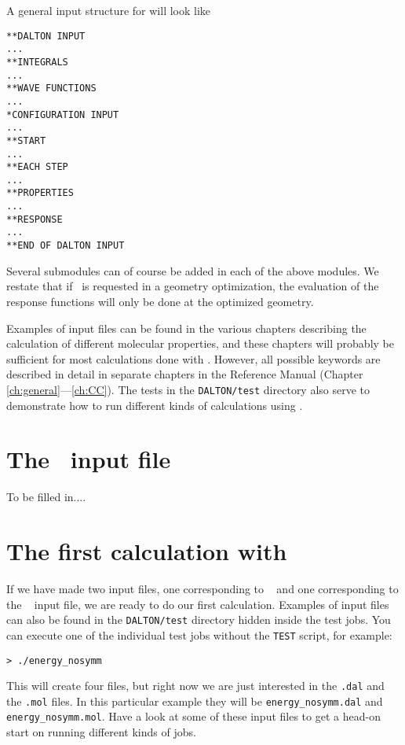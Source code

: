 A general input structure for {\dalton} will look like

\begin{verbatim}
**DALTON INPUT
...
**INTEGRALS
...
**WAVE FUNCTIONS
...
*CONFIGURATION INPUT
...
**START
...
**EACH STEP
...
**PROPERTIES
...
**RESPONSE
...
**END OF DALTON INPUT
\end{verbatim}

Several submodules can of course be added in each of the above
modules. We restate that if \resp\ is requested in a geometry
optimization, the evaluation of the response functions will only be
done at the optimized geometry.

Examples of input files can be found in the various chapters
describing the calculation of different molecular properties, and
these chapters will probably be sufficient for most calculations done
with {\dalton}. However, all possible keywords are described in detail
in separate chapters in the Reference Manual (Chapter \ref{ch:general}---\ref{ch:CC}). The tests in the
\verb|DALTON/test| directory also serve to demonstrate how to run
different kinds of calculations using {\dalton}.

\section{The \potinp\ input file}
To be filled in....

\section{The first calculation with {\dalton}}\label{sec:firstcalc}

If we have made two input files, one corresponding to
\dalinp\  and one corresponding to the \molinp\
 input file, we
are ready to do our first calculation. Examples of input files can
also be found in the \verb|DALTON/test| directory hidden inside the
test jobs. You can execute one of the individual test jobs
without the \verb|TEST| script, for example:
\begin{verbatim}
> ./energy_nosymm
\end{verbatim}
This will create four files, but right now we are just interested in
the \verb|.dal| and the \verb|.mol| files. In this particular example
they will be \verb|energy_nosymm.dal| and
\verb|energy_nosymm.mol|. Have a look at some of these input files to
get a head-on start on running different kinds of {\dalton} jobs.

